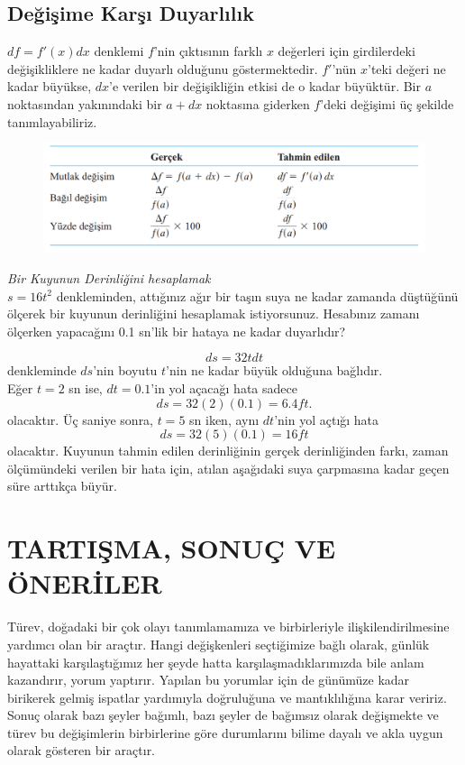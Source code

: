 \section{\protect Değişime Karşı Duyarlılık}
$df=f'(x)dx$ denklemi $f$'nin çıktısının farklı $x$ değerleri için girdilerdeki değişikliklere ne kadar duyarlı olduğunu göstermektedir. $f'$'nün $x$'teki değeri ne kadar büyükse, $dx$'e verilen bir değişikliğin etkisi de o kadar büyüktür. Bir $a$ noktasından yakınındaki bir $a+dx$ noktasına giderken $f$'deki değişimi üç şekilde tanımlayabiliriz.
\begin{figure}[H]
	\centering
	\includegraphics[width=0.9\linewidth]{degisimduyar.png}
	\label{fig:ornekresim}
\end{figure}
\begin{ornek} \textit{Bir Kuyunun Derinliğini hesaplamak}\\
$s=16t^2$ denkleminden, attığınız ağır bir taşın suya ne kadar zamanda düştüğünü ölçerek bir kuyunun derinliğini hesaplamak istiyorsunuz. Hesabınız zamanı ölçerken yapacağını 0.1 sn'lik bir hataya ne kadar duyarlıdır?
\end{ornek}
\begin{cozum}
	\begin{equation*}
	ds=32t dt
	\end{equation*}
denkleminde $ds$'nin boyutu $t$'nin ne kadar büyük olduğuna bağlıdır.\\
Eğer $t=2$ sn ise, $dt=0.1$'in yol açacağı hata sadece
	\begin{equation*}
	ds=32(2)(0.1)=6.4 ft.
	\end{equation*}
olacaktır. Üç saniye sonra, $t=5$ sn iken, aynı $dt$'nin yol açtığı hata
	\begin{equation*}
	ds=32(5)(0.1)=16ft
	\end{equation*}
olacaktır. Kuyunun tahmin edilen derinliğinin gerçek derinliğinden farkı, zaman ölçümündeki verilen bir hata için, atılan aşağıdaki suya çarpmasına kadar geçen süre arttıkça büyür.
\end{cozum}



\chapter{\protect TARTIŞMA, SONUÇ VE ÖNERİLER}

Türev, doğadaki bir çok olayı tanımlamamıza ve birbirleriyle ilişkilendirilmesine yardımcı olan bir araçtır. Hangi değişkenleri seçtiğimize bağlı olarak, günlük hayattaki karşılaştığımız her şeyde hatta karşılaşmadıklarımızda bile anlam kazandırır, yorum yaptırır. Yapılan bu yorumlar için de günümüze kadar birikerek gelmiş ispatlar yardımıyla doğruluğuna ve mantıklılığına karar veririz. Sonuç olarak bazı şeyler bağımlı, bazı şeyler de bağımsız olarak değişmekte ve türev bu değişimlerin birbirlerine göre durumlarını bilime dayalı ve akla uygun olarak gösteren bir araçtır.